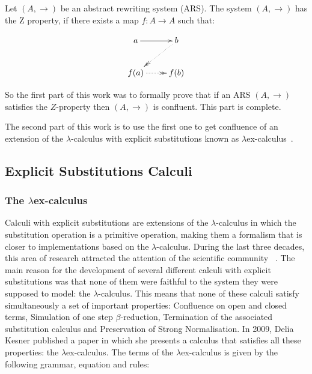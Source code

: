 \documentclass{llncs}
\begin{document}
\begin{definition}
      Let $(A,\to)$ be an abstract rewriting system (ARS). The system
    $(A,\to)$ has the Z property, if there exists a map $f:A \to A$
    such that:
    
    \[
      \xymatrix{
        a \ar[r] &  b \ar@{.>>}[dl]\\
        f(a) \ar@{.>>}[r] & f(b) \\ 
      }
    \]
\end{definition}

So the first part of this work was to formally prove that if an ARS $(A,\to)$ satisfies the $Z$-property then $(A,\to)$ is confluent. This part is complete. 

The second part of this work is to use the first one to get confluence of an extension of the $\lambda$-calculus with explicit substitutions known as $\lambda$ex-calculus~\cite{kes09}.

\subsection{Explicit Substitutions Calculi}


\subsubsection{The $\lambda$ex-calculus }


Calculi with explicit substitutions are extensions of the
$\lambda$-calculus in which the substitution operation is a primitive
operation, making them a formalism that is closer to implementations
based on the $\lambda$-calculus. During the last three decades, this
area of research attracted the attention of the scientific community
~\cite{Lins86,accl91,Bloo95,BeBrLeRD96,jfp,Munoz96,NaWi98,kes09}. The
main reason for the development of several different calculi with
explicit substitutions was that none of them were faithful to the
system they were supposed to model: the $\lambda$-calculus. This means
that none of these calculi satisfy simultaneously a set of important
properties: Confluence on open and closed terms, Simulation of one
step $\beta$-reduction, Termination of the associated substitution
calculus and Preservation of Strong Normalisation. In 2009, Delia
Kesner published a paper in which she presents a calculus that
satisfies all these properties: the $\lambda$ex-calculus. The terms of
the $\lambda$ex-calculus is given by the following grammar, equation and rules:
\end{document}
